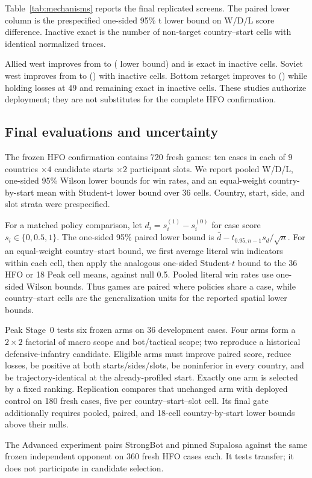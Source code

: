 Table~\ref{tab:mechanisms} reports the final replicated screens. The paired
lower column is the prespecified one-sided 95\% t lower bound on W/D/L score
difference. Inactive exact is the number of non-target country--start cells
with identical normalized traces.

\begin{table}[t]
\centering
\caption{Replicated scoped mechanisms and outcome-free isolation. Controls and
winners use the same cases and random streams.}
\label{tab:mechanisms}
\small

\end{table}

Allied west improves from \AlliedControlWdl{} to \AlliedWinnerWdl{}
(\AlliedPairedLower{} lower bound) and is exact in
\AlliedInactiveCells{} inactive cells. Soviet west improves from
\SovietControlWdl{} to \SovietWinnerWdl{} (\SovietPairedLower{}) with
\SovietInactiveCells{} inactive cells. Bottom retarget improves
\BottomControlWdl{} to \BottomWinnerWdl{} (\BottomPairedLower{}) while holding
losses at 49 and remaining exact in \BottomInactiveCells{} inactive cells.
These studies authorize deployment; they are not substitutes for the complete
HFO confirmation.

\subsection{Final evaluations and uncertainty}

The frozen HFO confirmation contains 720 fresh games: ten cases in each of
$9$ countries $\times 4$ candidate starts $\times 2$ participant slots.
We report pooled W/D/L, one-sided 95\% Wilson lower bounds for win rates, and an
equal-weight country-by-start mean with Student-t lower bound over 36 cells.
Country, start, side, and slot strata were prespecified.

For a matched policy comparison, let
$d_i=s_i^{(1)}-s_i^{(0)}$ for case score $s_i\in\{0,0.5,1\}$. The
one-sided 95\% paired lower bound is
$\bar d-t_{0.95,n-1}s_d/\sqrt{n}$. For an equal-weight country--start
bound, we first average literal win indicators within each cell, then apply the
analogous one-sided Student-$t$ bound to the 36 HFO or 18 Peak cell means,
against null 0.5. Pooled literal win rates use one-sided Wilson bounds. Thus
games are paired where policies share a case, while country--start cells are
the generalization units for the reported spatial lower bounds.

Peak Stage~0 tests six frozen arms on 36 development cases. Four arms form a
$2\times2$ factorial of macro scope and bot/tactical scope; two reproduce a
historical defensive-infantry candidate. Eligible arms must improve paired
score, reduce losses, be positive at both starts/sides/slots, be noninferior in
every country, and be trajectory-identical at the already-profiled start.
Exactly one arm is selected by a fixed ranking. Replication compares that
unchanged arm with deployed control on 180 fresh cases, five per
country--start--slot cell. Its final gate additionally requires pooled,
paired, and 18-cell country-by-start lower bounds above their nulls.

The Advanced experiment pairs StrongBot and pinned Supalosa against the same
frozen independent opponent on 360 fresh HFO cases each. It tests transfer; it
does not participate in candidate selection.
